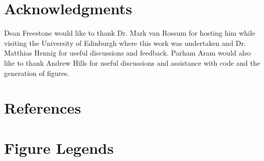 \documentclass[12pt]{iopart}
\begin{document}
\section{Acknowledgments}
Dean Freestone would like to thank Dr. Mark van Rossum for hosting him while visiting the University of Edinburgh where this work was undertaken and Dr. Matthias Hennig for useful discussions and feedback. Parham Aram would also like to thank Andrew Hills for useful discussions and assistance with code and the generation of figures.


\section*{References}
 


\section*{Figure Legends}
\end{document}
